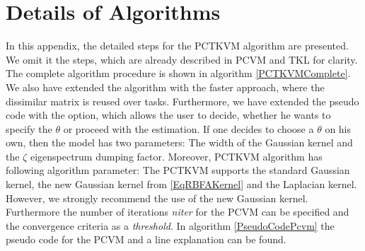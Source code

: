 \chapter{Details of Algorithms}\label{appac}
In this appendix, the detailed steps for the \acs{PCTKVM} algorithm are presented.
We omit it the steps, which are already described in \acs{PCVM} and \acs{TKL} for clarity.
The complete algorithm procedure is shown in algorithm \ref{PCTKVMComplete}.\\
We also have extended the algorithm with the faster approach, where the dissimilar matrix is reused over tasks.
Furthermore, we have extended the pseudo code with the option, which allows the user to decide, whether he wants to specify the $\theta$ or proceed with the estimation.
If one decides to choose a $\theta$ on his own, then the model has two parameters: The width of the Gaussian kernel and the $\zeta$ eigenspectrum dumping factor.
Moreover, \acs{PCTKVM} algorithm has following algorithm parameter:
The \acs{PCTKVM} supports the standard Gaussian kernel, the new Gaussian kernel from \eqref{EqRBFAKernel} and the Laplacian kernel.
However, we strongly recommend the use of the new Gaussian kernel.\\
Furthermore the number of iterations \textit{niter} for the \acs{PCVM} can be specified and the convergence criteria as a \textit{threshold}.
In algorithm \ref{PseudoCodePcvm} the pseudo code for the \acs{PCVM} and a line explanation can be found.

